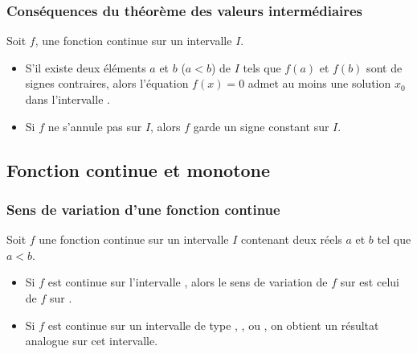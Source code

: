 \subsubsection{Conséquences du théorème des valeurs intermédiaires}\vspace*{-0.3cm}
\begin{propriete}[s]
	Soit $f$, une fonction continue sur un intervalle $I$.
\begin{itemize}
	\item S'il existe deux éléments $a$ et $b$ ($a<b
	$) de $I$ tels que $f(a)$ et $f(b)$ sont de signes contraires, alors l'équation $f(x)=0$ admet au moins une solution $x_0$ dans l'intervalle .
	\item Si $f$ ne s'annule pas sur $I$, alors $f$ garde un signe constant sur $I$.
\end{itemize}
\end{propriete}
\subsection{Fonction continue et monotone}
\subsubsection{Sens de variation d'une fonction continue}
\vspace*{-0.5cm}
\begin{propriete}[s]
	Soit $f$ une fonction continue sur un intervalle $I$ contenant deux réels $a$ et $b$ tel que $a<b$.
	\begin{itemize}
		\item Si $f$ est continue sur l'intervalle , alors le sens de variation de $f$ sur  est celui de $f$ sur .
		\item Si $f$ est continue sur un intervalle de type , ,  ou , on obtient un résultat analogue sur cet intervalle.
	\end{itemize}
\end{propriete}\vspace*{-0.3cm}

